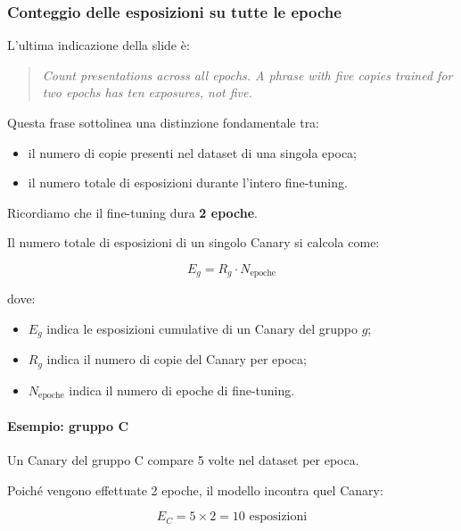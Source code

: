 \subsubsection{Conteggio delle esposizioni su tutte le epoche}

L'ultima indicazione della slide è:

\begin{quote}
    \textit{Count presentations across all epochs.
    A phrase with five copies trained for
    two epochs has ten exposures, not five.}
\end{quote}

Questa frase sottolinea una distinzione
fondamentale tra:
\begin{itemize}
    \item il numero di copie presenti
    nel dataset di una singola epoca;

    \item il numero totale di esposizioni
    durante l'intero fine-tuning.
\end{itemize}

Ricordiamo che il fine-tuning
dura \textbf{2 epoche}.

Il numero totale di esposizioni
di un singolo Canary si calcola come:

\begin{equation}
\boxed{
E_g = R_g \cdot N_{\text{epoche}}
}
\end{equation}

dove:
\begin{itemize}
    \item $E_g$ indica le esposizioni
    cumulative di un Canary del gruppo $g$;

    \item $R_g$ indica il numero di copie
    del Canary per epoca;

    \item $N_{\text{epoche}}$ indica
    il numero di epoche di fine-tuning.
\end{itemize}

\paragraph{Esempio: gruppo C}

Un Canary del gruppo C compare
5 volte nel dataset per epoca.

Poiché vengono effettuate 2 epoche,
il modello incontra quel Canary:

\begin{equation}
E_C = 5 \times 2
= \boxed{10 \text{ esposizioni}}
\end{equation}

